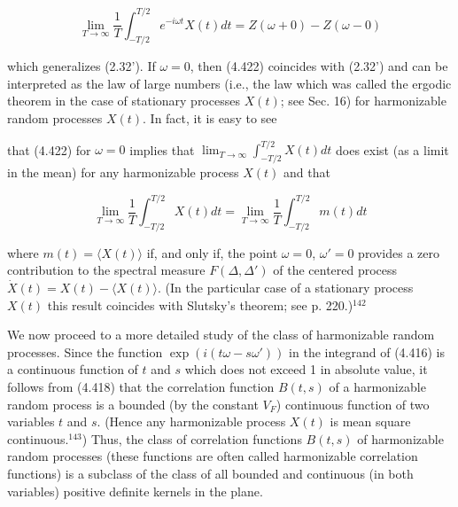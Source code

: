 \documentclass{article}
\begin{document}
\begin{equation}
\lim_{T\to\infty} \frac{1}{T} \int_{-T/2}^{T/2} e^{-i\omega t}X(t)dt = Z(\omega + 0) - Z(\omega - 0)
\end{equation}

which generalizes (2.32'). If $\omega = 0$, then (4.422) coincides with (2.32') and can be interpreted as the law of large numbers (i.e., the law which was called the ergodic theorem in the case of stationary processes $X(t)$; see Sec. 16) for harmonizable random processes $X(t)$. In fact, it is easy to see

that (4.422) for $\omega = 0$ implies that $\lim_{T\to\infty}\int_{-T/2}^{T/2} X(t)dt$ does exist (as a limit in the mean) for any harmonizable process $X(t)$ and that

\begin{equation}
\lim_{T\to\infty} \frac{1}{T}\int_{-T/2}^{T/2} X(t)dt = \lim_{T\to\infty} \frac{1}{T}\int_{-T/2}^{T/2} m(t)dt
\end{equation}

where $m(t) = \langle X(t) \rangle$ if, and only if, the point $\omega = 0$, $\omega' = 0$ provides a zero contribution to the spectral measure $F(\Delta,\Delta')$ of the centered process $\dot{X}(t) = X(t) - \langle X(t) \rangle$. (In the particular case of a stationary process $X(t)$ this result coincides with Slutsky's theorem; see p. 220.)$^{142}$

We now proceed to a more detailed study of the class of harmonizable random processes. Since the function $\exp(i(t\omega - s\omega'))$ in the integrand of (4.416) is a continuous function of $t$ and $s$ which does not exceed 1 in absolute value, it follows from (4.418) that the correlation function $B(t,s)$ of a harmonizable random process is a bounded (by the constant $V_F$) continuous function of two variables $t$ and $s$. (Hence any harmonizable process $X(t)$ is mean square continuous.$^{143}$) Thus, the class of correlation functions $B(t,s)$ of harmonizable random processes (these functions are often called harmonizable correlation functions) is a subclass of the class of all bounded and continuous (in both variables) positive definite kernels in the plane.
\end{document}
